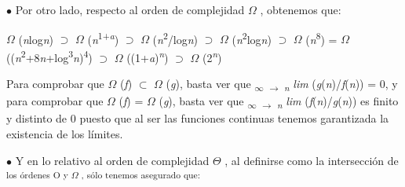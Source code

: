 \documentclass[12pt]{article}
\renewcommand{\_}{\kern-1.5pt\textunderscore\kern-1.5pt}
\begin{document}
\begin{adjustwidth}{0.58in}{1.4in}
{\fontsize{10pt}{12.0pt}\selectfont $\bullet$  Por otro lado, respecto al orden de complejidad $ \Omega $ , obtenemos que: \par}\par

\end{adjustwidth}

\begin{adjustwidth}{0.82in}{0.61in}
\begin{Center}
{\fontsize{10pt}{12.0pt}\selectfont $ \Omega $ (\textit{n}log\textit{n}) $\supset$  $ \Omega $ (\textit{n}\textsuperscript{1+\textit{a}}) $\supset$  $ \Omega $ (\textit{n}\textsuperscript{2}/log\textit{n}) $\supset$  $ \Omega $ (\textit{n}\textsuperscript{2}log\textit{n}) $\supset$  $ \Omega $ (\textit{n}\textsuperscript{8}) = $ \Omega $ ((\textit{n}\textsuperscript{2}+8\textit{n}+log\textsuperscript{3}\textit{n})\textsuperscript{4}) $\supset$  $ \Omega $ ((1+\textit{a})\textit{\textsuperscript{n}}) $\supset$  $ \Omega $ (2\textit{\textsuperscript{n}}) \par}
\end{Center}\par

\end{adjustwidth}

\begin{adjustwidth}{0.77in}{0.57in}
\begin{justify}
{\fontsize{10pt}{12.0pt}\selectfont Para comprobar que $ \Omega $ (\textit{f}) $ \subset $  $ \Omega $ (\textit{g}), basta ver que \textsubscript{$\infty$ $ \rightarrow $ \textit{n }}\textit{lim }(\textit{g}(\textit{n})/\textit{f}(\textit{n})) = 0, y para comprobar que $ \Omega $ (\textit{f}) = $ \Omega $ (\textit{g}), basta ver que \textsubscript{$\infty$ $ \rightarrow $ \textit{n }}\textit{lim }(\textit{f}(\textit{n})/\textit{g}(\textit{n})) es finito y distinto de 0 puesto que al ser las funciones continuas tenemos garantizada la existencia de los límites. \par}
\end{justify}\par

\end{adjustwidth}

\begin{adjustwidth}{0.58in}{0.57in}
{\fontsize{10pt}{12.0pt}\selectfont $\bullet$  Y en lo relativo al orden de complejidad $ \Theta $ , al definirse como la intersección de \textsubscript{los órdenes O y $ \Omega $ , sólo tenemos asegurado que: }\par}\par

\end{adjustwidth}
\end{document}
